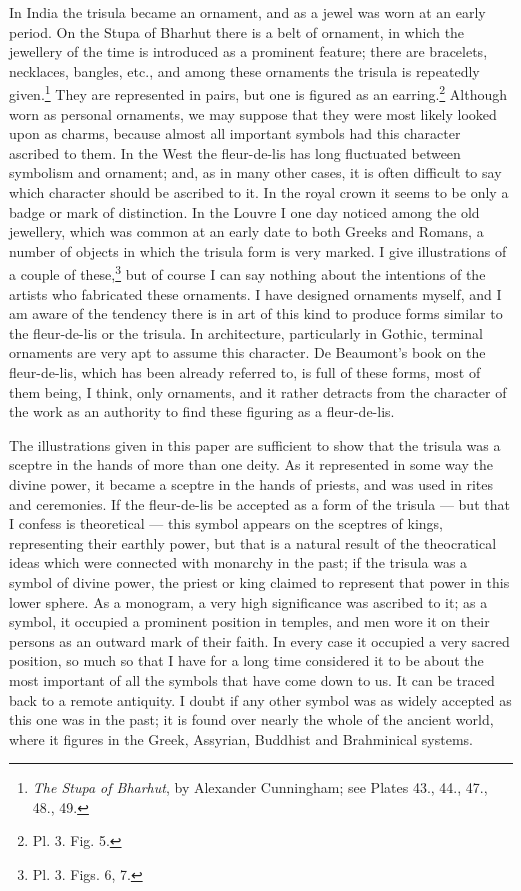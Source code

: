 \documentclass[a4paper, 11pt, oneside, english]{article}
\begin{document}
In India the trisula became an ornament, and as a jewel was worn at an early period. On the Stupa of Bharhut there is a belt of ornament, in which the jewellery of the time is introduced as a prominent feature; there are bracelets, necklaces, bangles, etc., and among these ornaments the trisula is repeatedly given.\footnote{\emph{The Stupa of Bharhut}, by Alexander Cunningham; see Plates 43., 44., 47., 48., 49.} They are represented in pairs, but one is figured as an earring.\footnote{Pl. 3. Fig. 5.} Although worn as personal ornaments, we may suppose that they were most likely looked upon as charms, because almost all important symbols had this character ascribed to them. In the West the fleur-de-lis has long fluctuated between symbolism and ornament; and, as in many other cases, it is often difficult to say which character should be ascribed to it. In the royal crown it seems to be only a badge or mark of distinction. In the Louvre I one day noticed among the old jewellery, which was common at an early date to both Greeks and Romans, a number of objects in which the trisula form is very marked. I give illustrations of a couple of these,\footnote{Pl. 3. Figs. 6, 7.} but of course I can say nothing about the intentions of the artists who fabricated these ornaments. I have designed ornaments myself, and I am aware of the tendency there is in art of this kind to produce forms similar to the fleur-de-lis or the trisula. In architecture, particularly in Gothic, terminal ornaments are very apt to assume this character. De Beaumont's book on the fleur-de-lis, which has been already referred to, is full of these forms, most of them being, I think, only ornaments, and it rather detracts from the character of the work as an authority to find these figuring as a fleur-de-lis.

The illustrations given in this paper are sufficient to show that the trisula was a sceptre in the hands of more than one deity. As it represented in some way the divine power, it became a sceptre in the hands of priests, and was used in rites and ceremonies. If the fleur-de-lis be accepted as a form of the trisula --- but that I confess is theoretical --- this symbol appears on the sceptres of kings, representing their earthly power, but that is a natural result of the theocratical ideas which were connected with monarchy in the past; if the trisula was a symbol of divine power, the priest or king claimed to represent that power in this lower sphere. As a monogram, a very high significance was ascribed to it; as a symbol, it occupied a prominent position in temples, and men wore it on their persons as an outward mark of their faith. In every case it occupied a very sacred position, so much so that I have for a long time considered it to be about the most important of all the symbols that have come down to us. It can be traced back to a remote antiquity. I doubt if any other symbol was as widely accepted as this one was in the past; it is found over nearly the whole of the ancient world, where it figures in the Greek, Assyrian, Buddhist and Brahminical systems.
\end{document}

